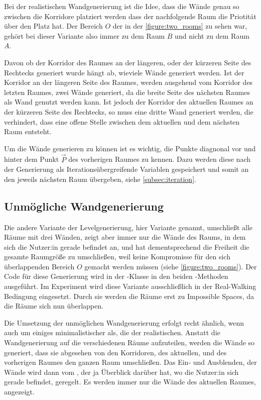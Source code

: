 Bei der realistischen Wandgenerierung ist die Idee, dass die Wände genau so zwischen die Korridore platziert werden dass der nachfolgende Raum die Priotität über den Platz hat. Der Bereich $O$ der in der \autoref{figure:two_rooms} zu sehen war, gehört bei dieser Variante also immer zu dem Raum $B$ und nicht zu dem Raum $A$.

Davon ob der Korridor des Raumes an der längeren, oder der kürzeren Seite des Rechtecks generiert wurde hängt ab, wieviele Wände generiert werden. Ist der Korridor an der längeren Seite des Raumes, werden ausgehend vom Korridor des letzten Raumes, zwei Wände generiert, da die breite Seite des nächsten Raumes als Wand genutzt werden kann. Ist jedoch der Korridor des aktuellen Raumes an der kürzeren Seite des Rechtecks, so muss eine dritte Wand generiert werden, die verhindert, dass eine offene Stelle zwischen dem aktuellen und dem nächsten Raum entsteht.

Um die Wände generieren zu können ist es wichtig, die Punkte diagnonal vor und hinter dem Punkt $\vec{P}$ des vorherigen Raumes zu kennen. Dazu werden diese nach der Generierung als Iterationsübergreifende Variablen gespeichert und somit an den jeweils nächsten Raum übergeben, siehe \autoref{subsec:iteration}.

\subsection{Unmögliche Wandgenerierung}
Die andere Variante der Levelgenerierung, hier  Variante genannt, umschließt alle Räume mit drei Wänden, zeigt aber immer nur die Wände des Raums, in dem sich die Nutzer:in gerade befindet an, und hat dementsprechend die Freiheit die gesamte Raumgröße zu umschließen, weil keine Kompromisse für den sich überlappenden Bereich $O$ gemacht werden müssen (siehe \autoref{figure:two_rooms}). Der Code für diese Generierung wird in der  -Klasse in den beiden -Methoden ausgeführt. Im Experiment wird diese Variante ausschließlich in der Real-Walking Bedingung eingesetzt. Durch sie werden die Räume erst zu Impossible Spaces, da die Räume sich nun überlappen.

Die Umsetzung der unmöglichen Wandgenerierung erfolgt recht ähnlich, wenn auch um einiges minimalistischer als, die der realistischen. Anstatt die Wandgenerierung auf die verschiedenen Räume aufzuteilen, werden die Wände so generiert, dass sie abgesehen von den Korridoren, des aktuellen, und des vorherigen Raumes den ganzen Raum umschließen. Das Ein- und Ausblenden, der Wände wird dann vom , der ja Überblick darüber hat, wo die Nutzer:in sich gerade befindet, geregelt. Es werden immer nur die Wände des aktuellen Raumes, angezeigt.


